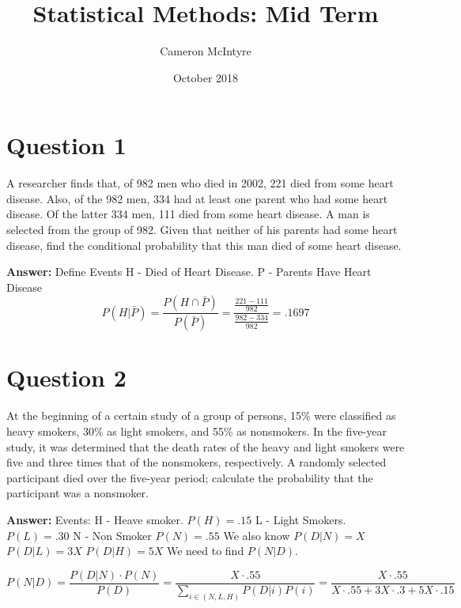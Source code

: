 \documentclass[svgnames]{article}
\title{Statistical Methods: Mid Term}
\author{Cameron McIntyre}
\date{October 2018}
\begin{document}
\maketitle

\section{Question 1}
 A researcher finds that, of 982 men who died in 2002, 221 died from some heart disease.
Also, of the 982 men, 334 had at least one parent who had some heart disease. Of the latter
334 men, 111 died from some heart disease. A man is selected from the group of 982. Given
that neither of his parents had some heart disease, find the conditional probability that this
man died of some heart disease.

\textbf{Answer:}
\newline
Define Events
\newline
H - Died of Heart Disease.
\newline
P - Parents Have Heart Disease 
 $$ P(H|\bar{P})=\frac{P(H\cap\bar{P})}{P(\bar{P})} = \frac{\frac{221-111}{982}}{\frac{982-334}{982}}=.1697$$


\section{Question 2}
 At the beginning of a certain study of a group of persons, 15\% were classified as heavy
smokers, 30\% as light smokers, and 55\% as nonsmokers. In the five-year study, it was
determined that the death rates of the heavy and light smokers were five and three times that
of the nonsmokers, respectively. A randomly selected participant died over the five-year
period; calculate the probability that the participant was a nonsmoker.

\textbf{Answer:}
\newline
Events:
\newline
H - Heave smoker. $P(H) = .15$
\newline
L - Light Smokers. $P(L) = .30$
\newline
N - Non Smoker $P(N) = .55$
\newline
We also know
\newline
$P(D|N)=X$
\newline
$P(D|L)=3X$
\newline
$P(D|H)=5X$
\newline
We need to find $P(N|D)$.

$$P(N|D)=\frac{P(D|N)\cdot P(N)}{P(D)}=\frac{X \cdot .55}{\sum_{i \in (N, L, H)} P(D|i)P(i)}=\frac{X \cdot .55}{X\cdot .55 + 3X\cdot .3 + 5X\cdot .15}$$
\end{document}
